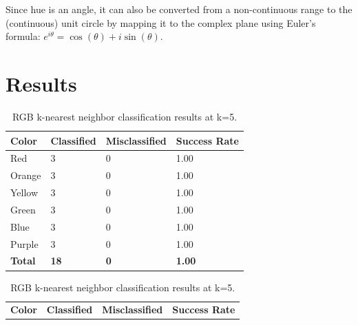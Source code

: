 \documentclass[twoside]{IEEEtran}
\begin{document}
Since hue is an angle, it can also be converted from a non-continuous range to the (continuous)
unit circle by mapping it to the complex plane using Euler's formula:
\( e^{i\theta} = \cos\left(\theta\right) + i \sin\left(\theta\right) \).

\section{Results}

\begin{table}[!b]
    \centering

    \begin{minipage}{\columnwidth}
        \centering
        \caption{RGB k-nearest neighbor classification results at k=3.}%
        \label{rgb_knn_3}
        \begin{tabular}{ l l l l }
            \toprule
            \bfseries Color & \bfseries Classified & \bfseries Misclassified & \bfseries Success Rate \\
            \midrule
            Red             & 3                    & 0                       & 1.00                   \\
            Orange          & 3                    & 0                       & 1.00                   \\
            Yellow          & 3                    & 0                       & 1.00                   \\
            Green           & 3                    & 0                       & 1.00                   \\
            Blue            & 3                    & 0                       & 1.00                   \\
            Purple          & 3                    & 0                       & 1.00                   \\
            \midrule
            \bfseries Total & \bfseries 18         & \bfseries 0             & \bfseries 1.00         \\
            \bottomrule
        \end{tabular}
    \end{minipage}%
    \begin{minipage}{\columnwidth}
        \centering
        \caption{RGB k-nearest neighbor classification results at k=5.}%
        \label{rgb_knn_5}
        \begin{tabular}{ l l l l }
            \toprule
            \bfseries Color & \bfseries Classified & \bfseries Misclassified & \bfseries Success Rate \\

\end{tabular}
\end{minipage}
\end{table}
\end{document}
